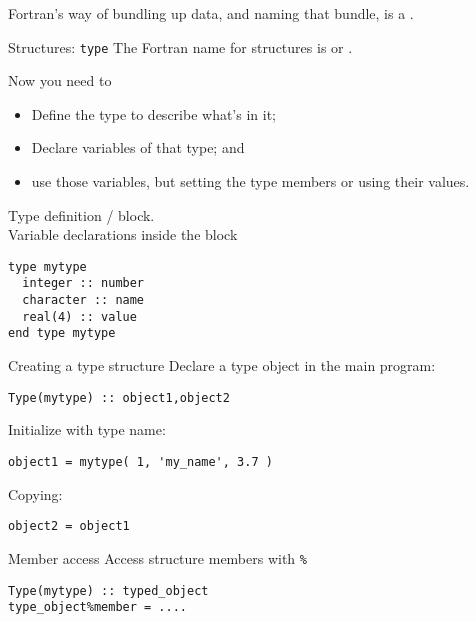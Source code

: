 
Fortran's way of bundling up data, and naming that bundle, is a
.

\begin{slide}{Structures: \noexpand\texttt{type}}
  \label{sl:ftype}
  The Fortran name for structures is  or
  .
\end{slide}

Now you need to
\begin{itemize}
\item Define the type to describe what's in it;
\item Declare variables of that type; and
\item use those variables, but setting the type members or using their
  values.
\end{itemize}

\begin{block}{Type definition}
  \label{sl:ftype-def}
   /  block.\\
  Variable declarations inside the block
\begin{lstlisting}
type mytype
  integer :: number
  character :: name
  real(4) :: value
end type mytype
\end{lstlisting}
\end{block}

\begin{block}{Creating a type structure}
  \label{sl:ftype-set}
  Declare a type object in the main program:
\begin{lstlisting}
Type(mytype) :: object1,object2
\end{lstlisting}
 Initialize with type name:
\begin{lstlisting}
object1 = mytype( 1, 'my_name', 3.7 )
\end{lstlisting}
Copying:
\begin{lstlisting}
object2 = object1
\end{lstlisting}

\end{block}

\begin{block}{Member access}
  \label{sl:ftype-access}
  Access structure members with \verb+%+
\begin{lstlisting}
Type(mytype) :: typed_object
type_object%member = ....  
\end{lstlisting}
\end{block}

